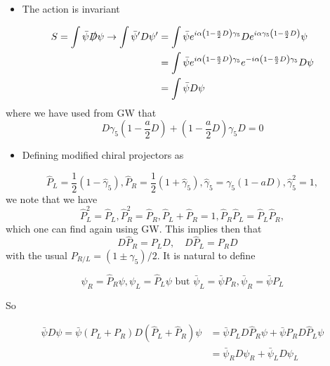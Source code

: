 \begin{itemize}
  \item The action is invariant
\end{itemize}
\begin{equation}
\begin{aligned}
S=\int \bar{\psi} \slashed{D} \psi \rightarrow \int \bar{\psi}^{\prime} D \psi^{\prime} & =\int \bar{\psi} e^{i \alpha\left(1-\frac{a}{2} D\right) \gamma_{5}} D e^{i \alpha \gamma_{5}\left(1-\frac{a}{2} D\right)} \psi \\
& =\int \bar{\psi} e^{i \alpha\left(1-\frac{a}{2}D\right) \gamma_{5}} e^{-i \alpha\left(1-\frac{a}{2} D\right) \gamma_{5}} D \psi  \\
& =\int \bar{\psi} D \psi
\end{aligned}
\end{equation}
where we have used from GW that
\begin{equation}
    D \gamma_5 \left(1- \frac{a}{2}D\right) + \left(1 - \frac{a}{2}D\right)\gamma_5 D = 0
\end{equation}
\begin{itemize}
  \item Defining modified chiral projectors as
\end{itemize}

\begin{equation}
\hat{P}_{L}=\frac{1}{2}\left(1-\hat{\gamma}_{5}\right), \hat{P}_{R}=\frac{1}{2}\left(1+\hat{\gamma}_{5}\right), \hat{\gamma}_{5}=\gamma_{5}(1-a D), \hat{\gamma}_{5}^{2}=1,
\end{equation}
we note that we have
\begin{equation}
    \hat{P}_L^2 = \hat{P}_L, \hat{P}^2_R = \hat{P}_R, \hat{P}_L + \hat{P}_R = 1, \hat{P}_R \hat{P}_L = \hat{P}_L \hat{P}_R,
\end{equation}
which one can find again using GW. This implies then that
\begin{equation}
    D \hat{P}_R = P_L D, \quad D \hat{P}_L = P_R D \quad 
\end{equation}
with the usual $P_{R/L} = (1\pm\gamma_5)/2$.
It is natural to define

\begin{equation}
\psi_{R}=\hat{P}_{R} \psi, \psi_{L}=\hat{P}_{L} \psi \text { but } \bar{\psi}_{L}=\bar{\psi} P_{R}, \bar{\psi}_{R}=\bar{\psi} P_{L}
\end{equation}

So

\begin{equation}
\begin{aligned}
\bar{\psi} D \psi=\bar{\psi}\left(P_{L}+P_{R}\right) D\left(\hat{P}_{L}+\hat{P}_{R}\right) \psi & =\bar{\psi} P_{L} D \hat{P}_{R} \psi+\bar{\psi} P_{R} D \hat{P}_{L} \psi \\
& =\bar{\psi}_{R} D \psi_R +\bar{\psi}_{L} D \psi_{L}
\end{aligned}
\end{equation}

